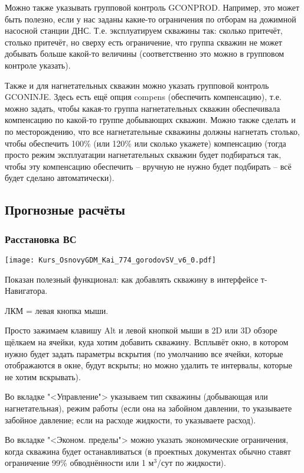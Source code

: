 \documentclass[main.tex]{subfiles}
\begin{document}
Можно также указывать групповой контроль GCONPROD.
Например, это может быть полезно, если у нас заданы какие-то ограничения по отборам на дожимной насосной станции ДНС.
Т.е. эксплуатируем скважины так: сколько притечёт, столько притечёт, но сверху есть ограничение, что группа скважин не может добывать больше какой-то величины (соответственно это можно в групповом контроле указать).

Также и для нагнетательных скважин можно указать групповой контроль GCONINJE.
Здесь есть ещё опция compens (обеспечить компенсацию), т.е. можно задать, чтобы какая-то группа нагнетательных скважин обеспечивала компенсацию по какой-то группе добывающих скважин.
Можно также сделать и по месторождению, что все нагнетательные скважины должны нагнетать столько, чтобы обеспечить 100\% (или 120\% или сколько укажете) компенсацию (тогда просто режим эксплуатации нагнетательных скважин будет подбираться так, чтобы эту компенсацию обеспечить -- вручную не нужно будет подбирать -- всё будет сделано автоматически).

\subsection{Прогнозные расчёты}

\subsubsection{Расстановка ВС}

\texttt{[image: Kurs\_OsnovyGDM\_Kai\_774\_gorodovSV\_v6\_0.pdf]}

Показан полезный функционал: как добавлять скважину в интерфейсе т-Навигатора.

ЛКМ = левая кнопка мыши.

Просто зажимаем клавишу Alt и левой кнопкой мыши в 2D или 3D обзоре щёлкаем на ячейки, куда хотим добавить скважину.
Всплывёт окно, в котором нужно будет задать параметры вскрытия (по умолчанию все ячейки, которые отображаются в окне, будут вскрыты; но можно удалить те интервалы, которые не хотим вскрывать).

Во вкладке "<Управление"> указываем тип скважины (добывающая или нагнетательная), режим работы (если она на забойном давлении, то указываете забойное давление; если на расходе жидкости, то указываете расход).

Во вкладке "<Эконом. пределы"> можно указать экономические ограничения, когда скважина будет останавливаться (в проектных документах обычно ставят ограничение 99\% обводнённости или 1 м$^3$/сут по жидкости).
\end{document}
